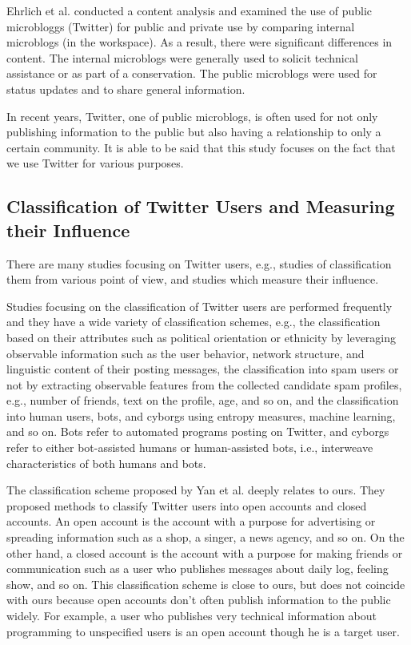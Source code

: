 Ehrlich et al.\cite{ehrlich2010microblogging} conducted a
content analysis and examined the use of public microbloggs
(Twitter) for public and private use by comparing internal
microblogs (in the workspace).  As a result, there were
significant differences in content.  The internal microblogs
were generally used to solicit technical assistance or as part of a
conservation.  The public microblogs were used for status
updates and to share general information.

In recent years, Twitter, one of public microblogs, is often
used for not only publishing information to the public but also having a
relationship to only a certain community.  It is able to be said that
this study focuses on the fact that we use Twitter for various purposes.

\subsection{Classification of Twitter Users and Measuring their Influence}
\label{subsec:Twitter User}

There are many studies focusing on Twitter users, e.g., studies of
classification them from various point of view, and studies which measure
their influence.

Studies focusing on the classification of Twitter users are performed
frequently and they have a wide variety of classification schemes, e.g.,
the classification based on their attributes such as political
orientation or ethnicity by leveraging observable information such as
the user behavior, network structure, and linguistic content of their
posting messages\cite{pennacchiotti2011machine}, the classification
into spam users or not by extracting observable features from the
collected candidate spam profiles, e.g., number of friends, text on the
profile, age, and so on\cite{lee2010social}, and the classification
into human users, bots, and cyborgs using entropy measures, machine
learning, and so on\cite{chu2010tweeting}.  Bots refer to automated
programs posting on Twitter, and cyborgs refer to either bot-assisted
humans or human-assisted bots, i.e., interweave characteristics of both
humans and bots.

The classification scheme proposed by Yan et
al.\cite{yan2013classifying} deeply relates to ours.  They proposed
methods to classify Twitter users into open accounts and closed
accounts.  An open account is the
account with a purpose for advertising or spreading information such as
a shop, a singer, a news agency, and so on.  On the other hand, a closed
account is the
account with a purpose for making friends or communication such as a
user who publishes messages about daily log, feeling show, and so on.
This classification scheme is close to ours, but does not coincide with
ours because open accounts don't often publish information to the public
widely.  For example, a user who publishes very technical information
about programming to unspecified users is an open account though he is a
target user.

